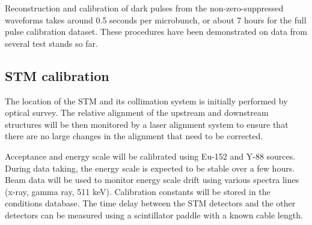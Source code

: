 Reconstruction and calibration of dark pulses from the non-zero-suppressed waveforms takes around 0.5 seconds per microbunch, or about 7 hours for the full pulse calibration dataset. These procedures have been demonstrated on data from several test stands so far.



\subsection{STM calibration}
The location of the STM and its collimation system is initially performed by optical survey. The relative alignment of the upstream and downstream structures will be then monitored by a laser alignment system to ensure that there are no large changes in the alignment that need to be corrected.

Acceptance and energy scale will be calibrated using Eu-152 and Y-88 sources. During data taking, the energy scale is expected to be stable over a few hours. Beam data will be used to monitor energy scale drift using various spectra lines (x-ray, gamma ray, 511 keV). Calibration constants will be stored in the conditions database. The time delay between the STM detectors and the other detectors can be measured using a scintillator paddle with a known cable length.

